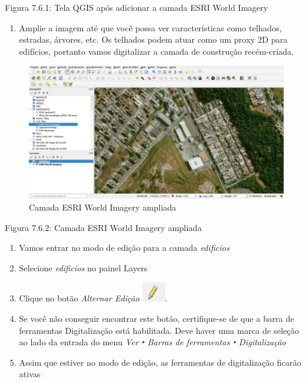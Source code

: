 \documentclass[
]{book}
\providecommand{\tightlist}{%
  \setlength{\itemsep}{0pt}\setlength{\parskip}{0pt}}
\begin{document}
Figura 7.6.1: Tela QGIS após adicionar a camada ESRI World Imagery

\begin{enumerate}
\def\labelenumi{\arabic{enumi}.}
\setcounter{enumi}{4}
\tightlist
\item
  Amplie a imagem até que você possa ver características como telhados, estradas, árvores, etc. Os telhados podem atuar como um proxy 2D para edifícios, portanto vamos digitalizar a camada de construção recém-criada.
\end{enumerate}

\begin{figure}
\centering
\includegraphics{media/modulo7/digitize-zoom.png}
\caption{Camada ESRI World Imagery ampliada}
\end{figure}

Figura 7.6.2: Camada ESRI World Imagery ampliada

\begin{enumerate}
\def\labelenumi{\arabic{enumi}.}
\setcounter{enumi}{5}
\tightlist
\item
  Vamos entrar no modo de edição para a camada \emph{edificios}
\item
  Selecione \emph{edificios} no painel Layers
\item
  Clique no botão \emph{Alternar Edição} \includegraphics{media/modulo7/edit-layer.png}.
\item
  Se você não conseguir encontrar este botão, certifique-se de que a barra de ferramentas Digitalização está habilitada. Deve haver uma marca de seleção ao lado da entrada do menu \emph{Ver ‣ Barras de ferramentas ‣ Digitalização}
\item
  Assim que estiver no modo de edição, as ferramentas de digitalização ficarão ativas
\end{enumerate}
\end{document}
